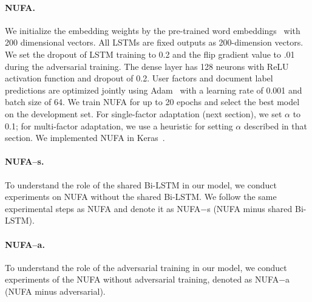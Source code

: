 \paragraph{NUFA.}
We initialize the embedding weights by the pre-trained word embeddings~\cite{mikolov2013distributed, pennington2014glove} with 200 dimensional vectors. All LSTMs are fixed outputs as 200-dimension vectors. We set the dropout of LSTM training to 0.2 and the flip gradient value to .01 during the adversarial training. The dense layer has 128 neurons with ReLU activation function and dropout of 0.2. User factors and document label predictions are optimized jointly using Adam~\cite{kingma2014adam} with a learning rate of 0.001 and batch size of 64. We train NUFA for up to 20 epochs and select the best model on the development set. 
For single-factor adaptation (next section), we set $\alpha$ to 0.1;
for multi-factor adaptation, we use a heuristic for setting $\alpha$ described in that section.
We implemented NUFA in Keras~\cite{chollet2015keras}.

\paragraph{NUFA--s.} To understand the role of the shared Bi-LSTM in our model, we conduct experiments on NUFA without the shared Bi-LSTM. We follow the same experimental steps as NUFA and denote it as NUFA$-$s (NUFA minus shared Bi-LSTM). %

\paragraph{NUFA--a.} To understand the role of the adversarial training in our model, we conduct experiments of the NUFA without adversarial training, denoted as NUFA$-$a (NUFA minus adversarial).




